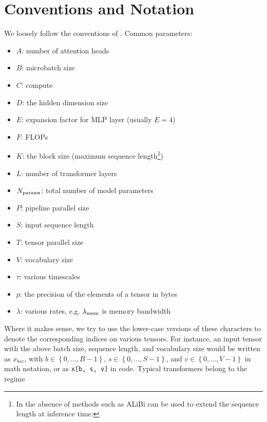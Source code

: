 \documentclass[11pt]{article}
\begin{document}
\appendix



\section{Conventions and Notation\label{app_conventions}}


We loosely follow the conventions of \cite{korthikanti2022reducing}.  Common parameters:
\begin{itemize}
    \item $ A $: number of attention heads
    \item $ B $: microbatch size
    \item $ C $: compute
    \item $ D $: the hidden dimension size
    \item $ E $: expansion factor for MLP layer (usually $ E=4 $)
    \item $ F $: FLOPs
    \item $ K $: the block size (maximum sequence length\footnote{In the absence of methods such as         ALiBi \cite{ALiBi}  can be used to extend the sequence length at inference time.})
    \item $ L $: number of transformer layers
    \item $ N _{ {\rm params}  } $: total number of model parameters
    \item $ P $: pipeline parallel size
    \item $ S $: input sequence length
    \item $ T $: tensor parallel size
    \item $ V $: vocabulary size
    \item $ \tau $: various timescales
    \item $ p $: the precision of the elements of a tensor in bytes
    \item $ \lambda  $: various rates, e.g. $ \lambda _{ {\rm mem}  } $ is memory bandwidth
\end{itemize}
Where it makes sense, we try to use the lower-case versions of these characters to denote the
corresponding indices on various tensors. For instance, an input tensor with the above batch size,
sequence length, and vocabulary size would be written as $ x _{ bsv } $, with $ b \in \left \{ 0,
\ldots, B - 1 \right \} $, $ s \in \left \{ 0, \ldots, S - 1\right \} $, and $  v \in \left \{ 0,
    \ldots, V -1\right \}$ in math notation, or as \texttt{x[b, s, v]} in code.  Typical
    transformers belong to the regime
\end{document}
